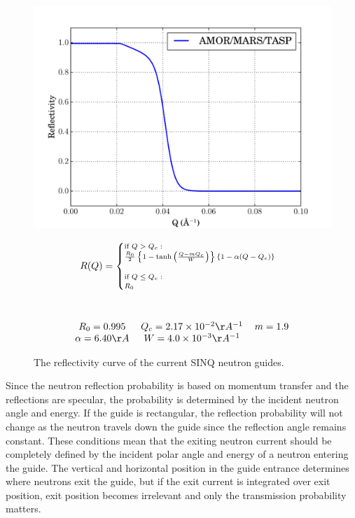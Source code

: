 \documentclass[preprint,12pt]{elsarticle}
\begin{document}
\begin{figure}[h]
\begin{minipage}{14pc}
\includegraphics[scale=.4]{graphics/refl.pdf}
\caption{\label{SINQ_reflectivity} The reflectivity curve of the current SINQ neutron guides.}
\end{minipage}\hspace{5pc}%
\begin{minipage}{11pc}
\begin{multline}\label{eq:ref}\scriptsize
R(Q) = 
\begin{cases}
    \mbox{if } Q > Q_c : \\
    \frac{R_0}{2}\left\{  1 - \tanh\left(  \frac{Q - m Q_c}{W}\right) \right\}\{1-\alpha(Q-Q_c)\} \\
    \\
    \mbox{if } Q \leq Q_c :\\
    R_0 \\
\end{cases} \\ \\ \\
\begin{tabular}{c c c}
$R_0=0.995$ & $Q_c=2.17\times10^{-2}\AA^{-1}$ & $m=1.9$ \\ 
$\alpha=6.40 \AA$ & $W=4.0\times10^{-3} \AA^{-1}$ 
\end{tabular} \\
\end{multline}
\end{minipage} 
\end{figure}

Since the neutron reflection probability is based on momentum transfer and the reflections are specular, the probability is determined by the incident neutron angle and energy.  If the guide is rectangular, the reflection probability will not change as the neutron travels down the guide since the reflection angle remains constant.  These conditions mean that the exiting neutron current should be completely defined by the incident polar angle and energy of a neutron entering the guide.  The vertical and horizontal position in the guide entrance determines where neutrons exit the guide, but if the exit current is integrated over exit position, exit position becomes irrelevant and only the transmission probability matters.
\end{document}
